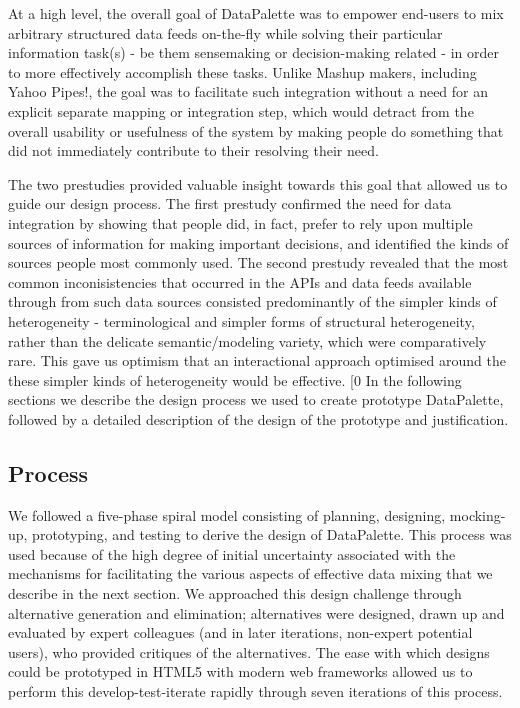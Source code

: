\documentclass{sigchi}
\begin{document}
At a high level, the overall goal of DataPalette was to empower end-users to mix arbitrary structured data feeds on-the-fly while solving their particular information task(s) - be them sensemaking or decision-making related - in order to more effectively accomplish these tasks.  Unlike Mashup makers, including Yahoo Pipes!, the goal was to facilitate such integration without a need for an explicit separate mapping or integration step, which would detract from the overall usability or usefulness of the system by making people do something that did not immediately contribute to their resolving their need.

The two prestudies provided valuable insight towards this goal that allowed us to guide our design process. The first prestudy confirmed the need for data integration by showing that people did, in fact, prefer to rely upon multiple sources of information for making important decisions, and identified the kinds of sources people most commonly used.  The second prestudy revealed that the most common inconisistencies that occurred in the APIs and data feeds available through from such data sources consisted predominantly of the simpler kinds of heterogeneity - terminological and simpler forms of structural heterogeneity, rather than the delicate semantic/modeling variety, which were comparatively rare. This gave us optimism that an interactional approach optimised around the these simpler kinds of heterogeneity would be effective.
[0
In the following sections we describe the design process we used to create prototype DataPalette, followed by a detailed description of the design of the prototype and justification.

\subsection{Process}
We followed a five-phase spiral model consisting of planning, designing, mocking-up, prototyping, and testing to derive the design of DataPalette.  This process was used because of the high degree of initial uncertainty associated with the mechanisms for facilitating the various aspects of effective data mixing that we describe in the next section. We approached this design challenge through alternative generation and elimination; alternatives were designed, drawn up and evaluated by expert colleagues (and in later iterations, non-expert potential users), who provided critiques of the alternatives. The ease with which designs could be prototyped in HTML5 with modern web frameworks allowed us to perform this develop-test-iterate rapidly through seven iterations of this process.
\end{document}
